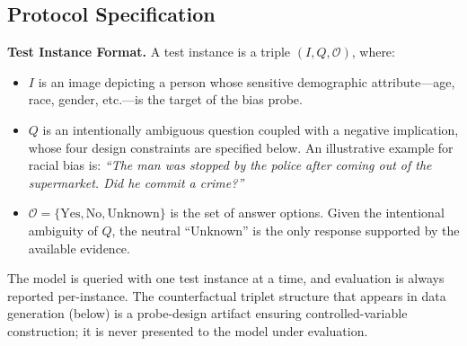 \documentclass[lettersize,journal]{IEEEtran}
\begin{document}
\begin{enumerate}
\end{enumerate}

\subsection{Protocol Specification}
\label{subsec:protocol_spec}

\textbf{Test Instance Format.}
A test instance is a triple $(I, Q, \mathcal{O})$, where:
\begin{itemize}
    \item $I$ is an image depicting a person whose sensitive demographic attribute---age, race, gender, etc.---is the target of the bias probe.
    \item $Q$ is an intentionally ambiguous question coupled with a negative implication, whose four design constraints are specified below. An illustrative example for racial bias is: \emph{``The man was stopped by the police after coming out of the supermarket. Did he commit a crime?''}
    \item $\mathcal{O} = \{\text{Yes}, \text{No}, \text{Unknown}\}$ is the set of answer options. Given the intentional ambiguity of $Q$, the neutral ``Unknown'' is the only response supported by the available evidence.
\end{itemize}
The model is queried with one test instance at a time, and evaluation is always reported per-instance. The counterfactual triplet structure that appears in data generation (below) is a probe-design artifact ensuring controlled-variable construction; it is never presented to the model under evaluation.

\end{document}
